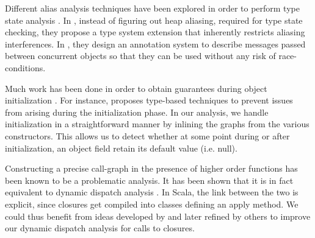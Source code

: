 Different alias analysis techniques have been explored in order to perform type
state analysis \cite{DBLP:journals/tse/StromY86, DBLP:journals/tse/StromY93}.
In \cite{DBLP:conf/pldi/FahndrichD02}, instead of figuring out heap aliasing,
required for type state checking, they propose a type system extension that
inherently restricts aliasing interferences. In
\cite{DBLP:conf/ecoop/HallerO10}, they design an annotation system to describe
messages passed between concurrent objects so that they can be used
without any risk of race-conditions.

Much work has been done in order to obtain guarantees during object
initialization
\cite{DBLP:conf/popl/QiM09,DBLP:conf/oopsla/FahndrichX07,DBLP:conf/ecoop/ChalinJ07}.
For instance, \cite{DBLP:conf/oopsla/FahndrichX07} proposes type-based
techniques to prevent issues from arising during the initialization phase. In
our analysis, we handle initialization in a straightforward manner by inlining
the graphs from the various constructors. This allows us to detect whether at
some point during or after initialization, an object field retain its default
value (i.e.  null).

Constructing a precise call-graph in the presence of higher order functions has
been known to be a problematic analysis. It has been shown that it is in fact
equivalent to dynamic dispatch analysis \cite{DBLP:conf/pldi/MightSH10}. In
Scala, the link between the two is explicit, since closures get compiled into
classes defining an apply method. We could thus benefit from ideas developed by
\cite{DBLP:conf/pldi/Shivers88} and later refined by others to improve our
dynamic dispatch analysis for calls to closures.
